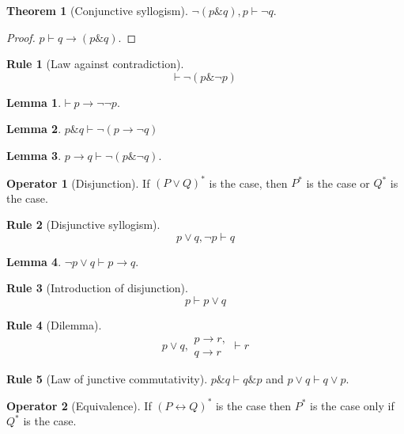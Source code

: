 \documentclass{amsbook}
\newcommand{\infers}{\mathrel\vdash}
\newcommand{\theorem}{\mathord\vdash\medspace}
\newcommand{\then}{\mathrel\rightarrow}
\newcommand{\conj}{\mathrel\&}
\newcommand{\eqv}{\mathrel\leftrightarrow}
\newcommand{\disj}{\mathrel\vee}
\theoremstyle{definition}
\newtheorem{frule}{Rule}[chapter]
\newtheorem{op}{Operator}[chapter]
\newtheorem{thm}{Theorem}[section]
\newtheorem{lmm}{Lemma}[section]
\begin{document}
\begin{thm}[Conjunctive syllogism]
    $\neg(p \conj q), p \infers \neg q$.
    \begin{proof}
        $p \infers q \then (p \conj q)$.
    \end{proof}
\end{thm}

\begin{frule}[Law against contradiction]
    $$\theorem \neg(p \conj \neg p)$$
\end{frule}

\begin{lmm}
    $\theorem p \then \neg\neg p$.
\end{lmm}

\begin{lmm}
    $p \conj q \infers \neg(p \then \neg q)$
\end{lmm}

\begin{lmm}
    $p \then q \infers \neg(p \conj \neg q)$.
\end{lmm}

\begin{op}[Disjunction]
    If $(P \disj Q)^*$ is the case, then $P^*$ is the case or $Q^*$ is the case.
\end{op}

\begin{frule}[Disjunctive syllogism]
    $$p \disj q, \neg p \infers q$$
\end{frule}

\begin{lmm}
    $\neg p \disj q \infers p \then q$.
\end{lmm}

\begin{frule}[Introduction of disjunction]
    $$p \infers p \disj q$$
\end{frule}

\begin{frule}[Dilemma]
    $$p \disj q,\begin{aligned}
            p \then r, \\ q \then r
        \end{aligned} \infers r$$
\end{frule}

\begin{frule}[Law of junctive commutativity]
    $p \conj q \infers q \conj p$ and $p \disj q \infers q \disj p$.
\end{frule}

\begin{op}[Equivalence]
    If $(P \eqv Q)^*$ is the case then $P^*$ is the case only if $Q^*$ is the case.
\end{op}
\end{document}
